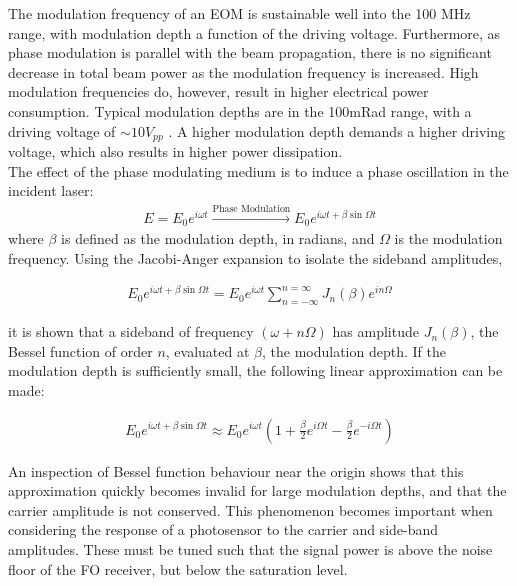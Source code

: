 The modulation frequency of an EOM is sustainable well into the 100 MHz range, with modulation depth a function of the driving voltage. Furthermore, as phase modulation is parallel with the beam propagation, there is no significant decrease in total beam power as the modulation frequency is increased. High modulation frequencies do, however, result in higher electrical power consumption. Typical modulation depths are in the 100mRad range, with a driving voltage of $\sim 10 V_{pp}$ \cite{thorlabs_eom}. A higher modulation depth demands a higher driving voltage, which also results in higher power dissipation. \\

The effect of the phase modulating medium is to induce a phase oscillation in the incident laser:
\begin{gather}
  E = E_0 e^{i\omega t} \xrightarrow{\mbox{Phase Modulation}}
    E_0 e^{i \omega t + \beta \sin \Omega t}
\end{gather}
where $\beta$ is defined as the modulation depth, in radians, and $\Omega$ is the modulation frequency. Using the Jacobi-Anger expansion to isolate the sideband amplitudes,

\begin{gather}
  E_0 e^{i \omega t + \beta \sin \Omega t}  =
  E_0 e^{i\omega t} \sum_{n = -\infty}^{n = \infty} J_n(\beta)e^{in\Omega}
\end{gather}

it is shown that a sideband of frequency $(\omega +n\Omega)$ has amplitude $J_n(\beta)$, the Bessel function of order $n$, evaluated at $\beta$, the modulation depth. If the modulation depth is sufficiently small, the following linear approximation can be made:

\begin{gather}
  E_0 e^{i \omega t + \beta \sin \Omega t}  \approx
    E_0 e^{i\omega t} \left(1 + \frac{\beta}{2}e^{i\Omega t} -
      \frac{\beta}{2} e^{-i\Omega t} \right)
\end{gather}

An inspection of Bessel function behaviour near the origin shows that this approximation quickly becomes invalid for large modulation depths, and that the carrier amplitude is not conserved. This phenomenon becomes important when considering the response of a photosensor to the carrier and side-band amplitudes. These must be tuned such that the signal power is above the noise floor of the FO receiver, but below the saturation level.


